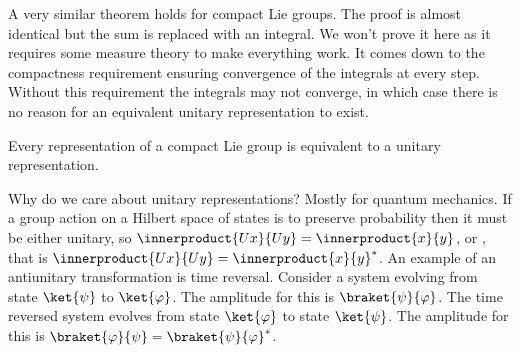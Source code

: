 \documentclass[fleqn]{NotesClass}
\begin{document}
    A very similar theorem holds for compact Lie groups.
    The proof is almost identical but the sum is replaced with an integral.
    We won't prove it here as it requires some measure theory to make everything work.
    It comes down to the compactness requirement ensuring convergence of the integrals at every step.
    Without this requirement the integrals may not converge, in which case there is no reason for an equivalent unitary representation to exist.
    \begin{thm}{}{}
        Every representation of a compact Lie group is equivalent to a unitary representation.
    \end{thm}
    
    Why do we care about unitary representations?
    Mostly for quantum mechanics.
    If a group action on a Hilbert space of states is to preserve probability then it must be either unitary, so \(\innerproduct{Ux}{Uy} = \innerproduct{x}{y}\), or , that is \(\innerproduct{Ux}{Uy} = \innerproduct{x}{y}^*\).
    An example of an antiunitary transformation is time reversal.
    Consider a system evolving from state \(\ket{\psi}\) to \(\ket{\varphi}\).
    The amplitude for this is \(\braket{\psi}{\varphi}\).
    The time reversed system evolves from state \(\ket{\varphi}\) to state \(\ket{\psi}\).
    The amplitude for this is \(\braket{\varphi}{\psi} = \braket{\psi}{\varphi}^*\).
    
    
    \backmatter
    \printindex
\end{document}
